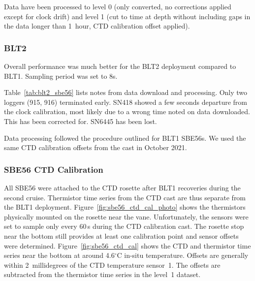 \documentclass[10pt,letterpaper]{article}
\begin{document}
Data have been processed to level 0 (only converted, no corrections applied except for clock drift) and level 1 (cut to time at depth without including gaps in the data longer than 1~hour, CTD calibration offset applied).

\subsubsection*{BLT2}
\label{sub:sbe56_blt2}

Overall performance was much better for the BLT2 deployment compared to BLT1. Sampling period was set to 8s.

Table~\ref{tab:blt2_sbe56} lists notes from data download and processing. Only two loggers (915, 916) terminated early. SN418 showed a few seconds departure from the clock calibration, most likely due to a wrong time noted on data downloaded. This has been corrected for. SN6445 has been lost.

Data processing followed the procedure outlined for BLT1 SBE56s. We used the same CTD calibration offsets from the cast in October 2021.


\subsubsection*{SBE56 CTD Calibration}
\label{sub:sbe_ctd_calibration}

All SBE56 were attached to the CTD rosette after BLT1 recoveries during the second cruise. Thermistor time series from the CTD cast are thus separate from the BLT1 deployment. Figure~\ref{fig:sbe56_ctd_cal_photo} shows the thermistors physically mounted on the rosette near the vane. Unfortunately, the sensors were set to sample only every 60\,s during the CTD calibration cast. The rosette stop near the bottom still provides at least one calibration point and sensor offsets were determined. Figure~\ref{fig:sbe56_ctd_cal} shows the CTD and thermistor time series near the bottom at around 4.6$^{\circ}$C in-situ temperature. Offsets are generally within 2~millidegrees of the CTD temperature sensor~1. The offsets are subtracted from the thermistor time series in the level~1 dataset.
\end{document}
